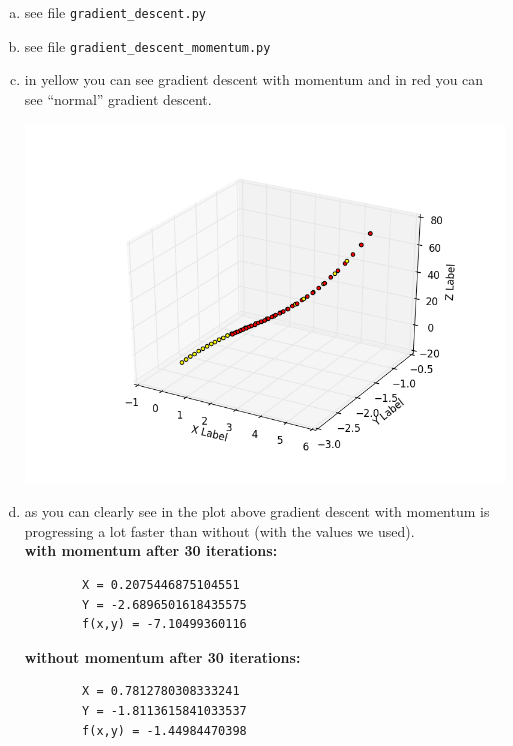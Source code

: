 \documentclass[12pt]{article}
\begin{document}
\begin{enumerate}[a)]
    \item 
        see file \verb!gradient_descent.py!

    \item
        see file \verb!gradient_descent_momentum.py!

    \item
        in yellow you can see gradient descent with momentum and in red you can see ``normal'' gradient descent.\\
        \begin{center}
            \includegraphics[scale = 0.8]{pictures/figure_1}\\
        \end{center}

    \item
        as you can clearly see in the plot above gradient descent with momentum is progressing a lot faster than without (with the values we used).\\

        \textbf{with momentum after 30 iterations:}
        \begin{verbatim}
        X = 0.2075446875104551
        Y = -2.6896501618435575
        f(x,y) = -7.10499360116
        \end{verbatim}

        \textbf{without momentum after 30 iterations:}
        \begin{verbatim}
        X = 0.7812780308333241
        Y = -1.8113615841033537
        f(x,y) = -1.44984470398
        \end{verbatim}


\end{enumerate}
\end{document}

